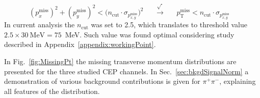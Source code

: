 \begin{equation}%
\left(p_{x}^{\text{miss}}\right)^{2} + \left(p_{y}^{\text{miss}}\right)^{2} < \Big(n_{\text{cut}}\cdot\sigma_{p_{x,y}^{\text{miss}}}\Big)^{2}~~~~~~~\xrightarrow[~]{\sqrt{~}}~~~~~~~p_{\text{T}}^{\text{miss}} < n_{\text{cut}}\cdot\sigma_{p_{x,y}^{\text{miss}}}~~~~
\end{equation}%
%
In current analysis the $n_{\text{cut}}$ was set to 2.5, which translates to threshold value $2.5\times 30~\text{MeV} = 75$~MeV. Such value was found optimal considering study described in Appendix~\ref{appendix:workingPoint}.

In Fig.~\ref{fig:MissingPt} the missing transverse momentum distributions are presented for the three studied CEP channels. In Sec.~\ref{sec:bkgdSignalNorm} a demonstration of various background contributions is given for $\pi^{+}\pi^{-}$, explaining all features of the distribution.



